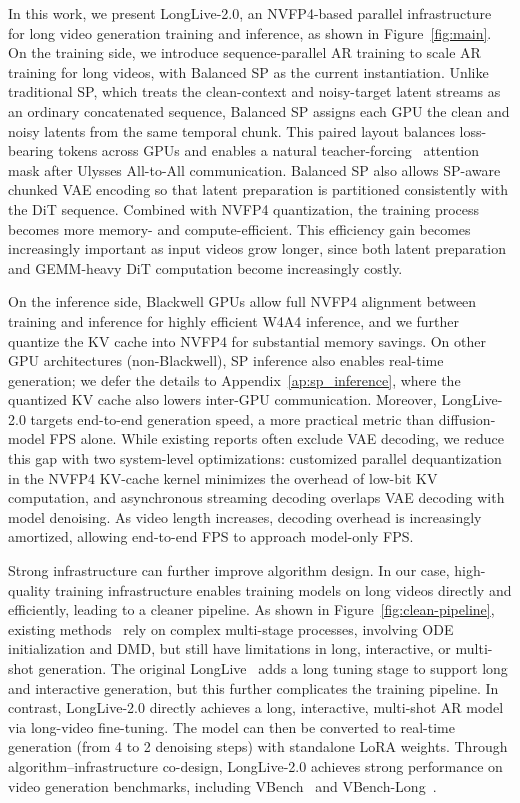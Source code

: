 In this work, we present LongLive-2.0, an NVFP4-based parallel infrastructure for long video generation training and inference, as shown in Figure~\ref{fig:main}. 
On the training side, we introduce sequence-parallel AR training to scale AR training for long videos, with Balanced SP as the current instantiation. Unlike traditional SP, which treats the clean-context and noisy-target latent streams as an ordinary concatenated sequence, Balanced SP assigns each GPU the clean and noisy latents from the same temporal chunk. This paired layout balances loss-bearing tokens across GPUs and enables a natural teacher-forcing~\cite{zhou2025taming} attention mask after Ulysses All-to-All communication. Balanced SP also allows SP-aware chunked VAE encoding so that latent preparation is partitioned consistently with the DiT sequence. Combined with NVFP4 quantization, the training process becomes more memory- and compute-efficient. This efficiency gain becomes increasingly important as input videos grow longer, since both latent preparation and GEMM-heavy DiT computation become increasingly costly. 

On the inference side, Blackwell GPUs allow full NVFP4 alignment between training and inference for highly efficient W4A4 inference, and we further quantize the KV cache into NVFP4 for substantial memory savings. On other GPU architectures (non-Blackwell), SP inference also enables real-time generation; we defer the details to Appendix~\ref{ap:sp_inference}, where the quantized KV cache also lowers inter-GPU communication.
Moreover, LongLive-2.0 targets end-to-end generation speed, a more practical metric than diffusion-model FPS alone. While existing reports often exclude VAE decoding, we reduce this gap with two system-level optimizations: customized parallel dequantization in the NVFP4 KV-cache kernel minimizes the overhead of low-bit KV computation, and asynchronous streaming decoding overlaps VAE decoding with model denoising. As video length increases, decoding overhead is increasingly amortized, allowing end-to-end FPS to approach model-only FPS.


Strong infrastructure can further improve algorithm design. In our case, high-quality training infrastructure enables training models on long videos directly and efficiently, leading to a cleaner pipeline. As shown in Figure~\ref{fig:clean-pipeline}, existing methods~\cite{huang2025self, zhu2026causal} rely on complex multi-stage processes, involving ODE initialization and DMD, but still have limitations in long, interactive, or multi-shot generation. The original LongLive~\cite{yang2025longlive} adds a long tuning stage to support long and interactive generation, but this further complicates the training pipeline. In contrast, LongLive-2.0 directly achieves a long, interactive, multi-shot AR model via long-video fine-tuning. 
The model can then be converted to real-time generation (from 4 to 2 denoising steps) with standalone LoRA weights. Through algorithm–infrastructure co-design, LongLive-2.0 achieves strong performance on video generation benchmarks, including VBench~\cite{vbench} and VBench-Long~\cite{vbench-long}.
